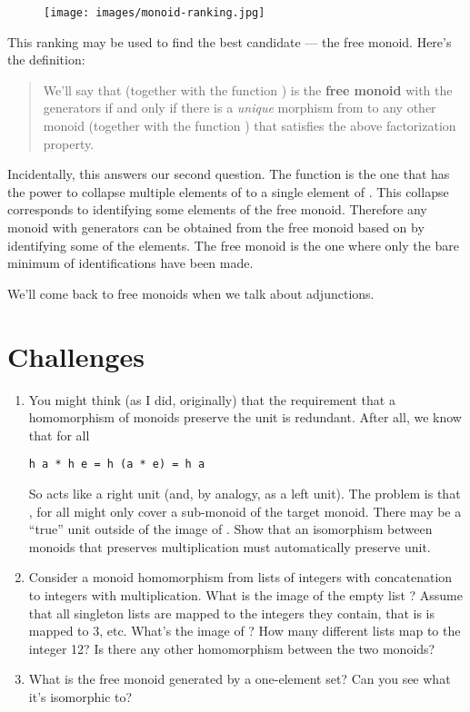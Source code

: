 \begin{figure}[H]
\centering
\texttt{[image: images/monoid-ranking.jpg]}
\end{figure}

\noindent
This ranking may be used to find the best candidate --- the free monoid.
Here's the definition:

\begin{quote}
We'll say that  (together with the function ) is the
\textbf{free monoid} with the generators  if and only if there
is a \emph{unique} morphism  from  to any other
monoid  (together with the function ) that satisfies
the above factorization property.
\end{quote}
Incidentally, this answers our second question. The function
 is the one that has the power to collapse multiple
elements of  to a single element of . This
collapse corresponds to identifying some elements of the free monoid.
Therefore any monoid with generators  can be obtained from the
free monoid based on  by identifying some of the elements. The
free monoid is the one where only the bare minimum of identifications
have been made.

We'll come back to free monoids when we talk about adjunctions.

\section{Challenges}\label{challenges}

\begin{enumerate}
\tightlist
\item
  You might think (as I did, originally) that the requirement that a
  homomorphism of monoids preserve the unit is redundant. After all, we
  know that for all 

\begin{Verbatim}[commandchars=\\\{\}]
h a * h e = h (a * e) = h a
\end{Verbatim}
  So  acts like a right unit (and, by analogy, as a left
  unit). The problem is that , for all  might
  only cover a sub-monoid of the target monoid. There may be a ``true''
  unit outside of the image of . Show that an isomorphism
  between monoids that preserves multiplication must automatically
  preserve unit.
\item
  Consider a monoid homomorphism from lists of integers with
  concatenation to integers with multiplication. What is the image of
  the empty list \code{{[}{]}}? Assume that all singleton lists are
  mapped to the integers they contain, that is \code{{[}3{]}} is
  mapped to 3, etc. What's the image of \code{{[}1, 2, 3, 4{]}}?
  How many different lists map to the integer 12? Is there any other
  homomorphism between the two monoids?
\item
  What is the free monoid generated by a one-element set? Can you see
  what it's isomorphic to?
\end{enumerate}
